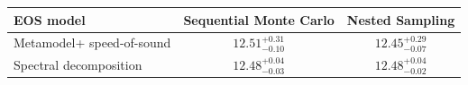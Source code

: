 \renewcommand{\arraystretch}{1.4}
\begin{tabular}{p{4.5cm}cc}
    \hline
    EOS model & Sequential Monte Carlo & Nested Sampling \\
    \hline
    Metamodel\newline + speed-of-sound & $12.51^{+0.31}_{-0.10}$ & $12.45^{+0.29}_{-0.07}$ \\
    Spectral decomposition & $12.48^{+0.04}_{-0.03}$ & $12.48^{+0.04}_{-0.02}$ \\
    \hline
\end{tabular}
